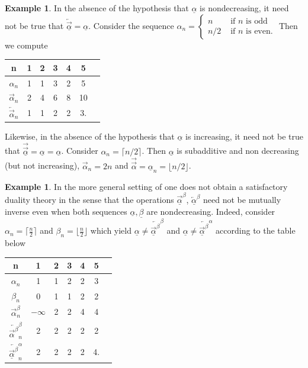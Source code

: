 \documentclass[12pt, reqno]{amsart}
\numberwithin{equation}{section}
\def\a{\ensuremath{\alpha}}
\def\ua{\ensuremath{\underline{\alpha}}}
\def\b{\ensuremath{\beta}}
\def\ub{\ensuremath{\underline{\beta}}}
\theoremstyle{plain} %
\theoremstyle{definition}
\newtheorem{ex}[thm]{Example}
\theoremstyle{remark}
\newcommand{\uau}{\overrightarrow{\ua}}
\newcommand{\au}{\overrightarrow{\alpha}}
\begin{document}
\begin{ex}
In the absence of the hypothesis that $\ua$ is nondecreasing, it need not be true that $\overleftarrow{\uau}=\ua$. Consider the sequence 
$
\a_n=\begin{cases} 
n & \text{ if } n \text{ is odd}\\
n/2 & \text{ if } n \text{ is even}.
\end{cases}
$
Then we compute
\begin{center}
\begin{tabular}{c|cccccc}
n & 1& 2 & 3 & 4 & 5  \\
\hline
$\a_n$ & 1 & 1 & 3 & 2 & 5 \\
$\au_n$ & 2& 4 & 6 & 8 & 10 \\
$\overleftarrow{\au}_n$ & 1& 1 & 2 & 2 & 3.
\end{tabular}
\end{center}

Likewise, in the absence of the hypothesis that $\ua$ is increasing, it need not be true that $\overrightarrow{\uau}=\ua=\ua$. Consider $\a_n=\lceil n/2\rceil$. Then $\ua$ is subadditive and non decreasing (but not increasing), $\au_n=2n$ and $\overrightarrow{\au}=\ua_n=\lfloor n/2\rfloor$. 

\end{ex}

\begin{ex}
In the more general setting of  one does not obtain a satisfactory duality theory in the sense that the operations $\overrightarrow{\ua}^\b$,  $\overleftarrow{\ua}^\b$ need not be mutually inverse even when both sequences $\ua, \ub$ are nondecreasing. Indeed, consider $\a_n=\lceil \frac{n}{2} \rceil$ and $\b_n=\lfloor \frac{n}{2} \rfloor$ which yield $\ua\neq {\overleftarrow{\uau^\b}}^\b$ and $\ua\neq {\overleftarrow{\uau^\b}}^\a$ according to the table below 
\begin{center}
\begin{tabular}{c|cccccc}
n & 1& 2 & 3 & 4 & 5   \\
\hline
$\a_n$ & 1 & 1 & 2 & 2 & 3 \\
$\b_n$ & 0 & 1 & 1 & 2 & 2 \\
$\au^\b_n$ & $-\infty$ & 2 & 2 & 4 & 4 \\
${\overleftarrow{\au^\b}}^\b_n$ & 2 & 2 & 2 & 2 & 2\\
${\overleftarrow{\uau^\b}}^\a_n$ & 2 & 2& 2& 2& 4.
\end{tabular}
\end{center}
\end{ex} 
\end{document}
